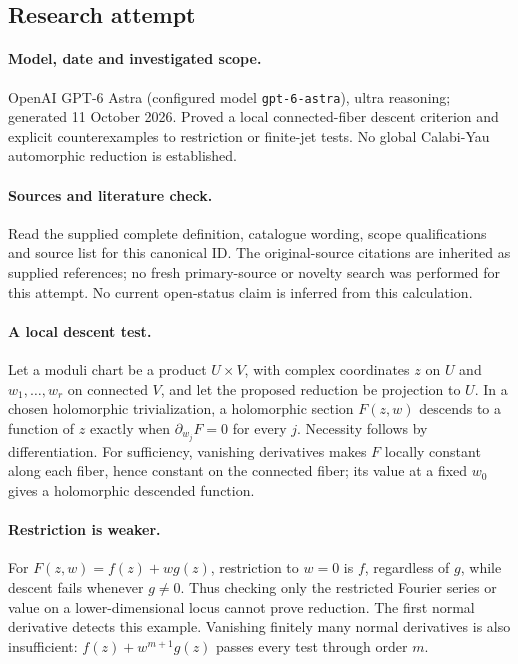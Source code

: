 \documentclass[11pt]{article}
\begin{document}
\subsection{Research attempt}
\paragraph{Model, date and investigated scope.}
OpenAI GPT-6 Astra (configured model \texttt{gpt-6-astra}), ultra reasoning; generated 11 October 2026. Proved a local connected-fiber descent criterion and explicit counterexamples to restriction or finite-jet tests. No global Calabi-Yau automorphic reduction is established.

\paragraph{Sources and literature check.}
Read the supplied complete definition, catalogue wording, scope qualifications and source list for this canonical ID. The original-source citations are inherited as supplied references; no fresh primary-source or novelty search was performed for this attempt. No current open-status claim is inferred from this calculation.

\paragraph{A local descent test.}Let a moduli chart be a product \(U\times V\), with complex coordinates \(z\) on \(U\) and \(w_1,\ldots,w_r\) on connected \(V\), and let the proposed reduction be projection to \(U\). In a chosen holomorphic trivialization, a holomorphic section \(F(z,w)\) descends to a function of \(z\) exactly when \(\partial_{w_j}F=0\) for every \(j\). Necessity follows by differentiation. For sufficiency, vanishing derivatives makes \(F\) locally constant along each fiber, hence constant on the connected fiber; its value at a fixed \(w_0\) gives a holomorphic descended function.
\paragraph{Restriction is weaker.}For \(F(z,w)=f(z)+w g(z)\), restriction to \(w=0\) is \(f\), regardless of \(g\), while descent fails whenever \(g\ne0\). Thus checking only the restricted Fourier series or value on a lower-dimensional locus cannot prove reduction. The first normal derivative detects this example. Vanishing finitely many normal derivatives is also insufficient: \(f(z)+w^{m+1}g(z)\) passes every test through order \(m\).
\end{document}
